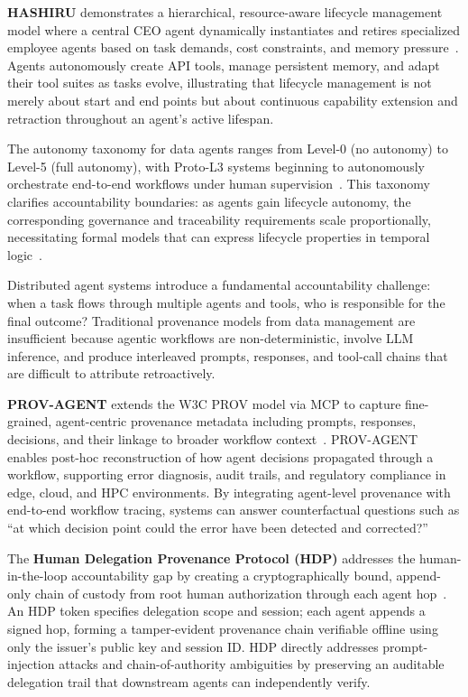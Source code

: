 \textbf{HASHIRU} demonstrates a hierarchical, resource-aware lifecycle management model where a central CEO agent dynamically instantiates and retires specialized employee agents based on task demands, cost constraints, and memory pressure~\cite{arxiv:2506.04255}. Agents autonomously create API tools, manage persistent memory, and adapt their tool suites as tasks evolve, illustrating that lifecycle management is not merely about start and end points but about continuous capability extension and retraction throughout an agent's active lifespan.

The autonomy taxonomy for data agents ranges from Level-0 (no autonomy) to Level-5 (full autonomy), with Proto-L3 systems beginning to autonomously orchestrate end-to-end workflows under human supervision~\cite{arxiv:2602.04261}. This taxonomy clarifies accountability boundaries: as agents gain lifecycle autonomy, the corresponding governance and traceability requirements scale proportionally, necessitating formal models that can express lifecycle properties in temporal logic~\cite{arxiv:2510.14133v2}.


Distributed agent systems introduce a fundamental accountability challenge: when a task flows through multiple agents and tools, who is responsible for the final outcome? Traditional provenance models from data management are insufficient because agentic workflows are non-deterministic, involve LLM inference, and produce interleaved prompts, responses, and tool-call chains that are difficult to attribute retroactively.

\textbf{PROV-AGENT} extends the W3C PROV model via MCP to capture fine-grained, agent-centric provenance metadata including prompts, responses, decisions, and their linkage to broader workflow context~\cite{arxiv:2508.02866}. PROV-AGENT enables post-hoc reconstruction of how agent decisions propagated through a workflow, supporting error diagnosis, audit trails, and regulatory compliance in edge, cloud, and HPC environments. By integrating agent-level provenance with end-to-end workflow tracing, systems can answer counterfactual questions such as ``at which decision point could the error have been detected and corrected?''

The \textbf{Human Delegation Provenance Protocol (HDP)} addresses the human-in-the-loop accountability gap by creating a cryptographically bound, append-only chain of custody from root human authorization through each agent hop~\cite{IETF:draft-helixar-hdp-agentic-delegation}. An HDP token specifies delegation scope and session; each agent appends a signed hop, forming a tamper-evident provenance chain verifiable offline using only the issuer's public key and session ID. HDP directly addresses prompt-injection attacks and chain-of-authority ambiguities by preserving an auditable delegation trail that downstream agents can independently verify.

